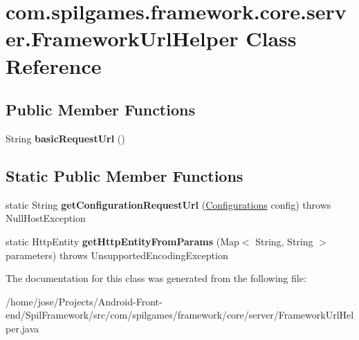\hypertarget{classcom_1_1spilgames_1_1framework_1_1core_1_1server_1_1_framework_url_helper}{\section{com.\-spilgames.\-framework.\-core.\-server.\-Framework\-Url\-Helper Class Reference}
\label{classcom_1_1spilgames_1_1framework_1_1core_1_1server_1_1_framework_url_helper}
}
\subsection*{Public Member Functions}
\begin{DoxyCompactItemize}
\item 
\hypertarget{classcom_1_1spilgames_1_1framework_1_1core_1_1server_1_1_framework_url_helper_ab3584e73334c303477371eb98eaa6947}{String {\bfseries basic\-Request\-Url} ()}\label{classcom_1_1spilgames_1_1framework_1_1core_1_1server_1_1_framework_url_helper_ab3584e73334c303477371eb98eaa6947}

\end{DoxyCompactItemize}
\subsection*{Static Public Member Functions}
\begin{DoxyCompactItemize}
\item 
\hypertarget{classcom_1_1spilgames_1_1framework_1_1core_1_1server_1_1_framework_url_helper_a3d0a1e7b9d94d87d33cb735abd8e07a6}{static String {\bfseries get\-Configuration\-Request\-Url} (\hyperlink{classcom_1_1spilgames_1_1framework_1_1data_1_1_configurations}{Configurations} config)  throws Null\-Host\-Exception }\label{classcom_1_1spilgames_1_1framework_1_1core_1_1server_1_1_framework_url_helper_a3d0a1e7b9d94d87d33cb735abd8e07a6}

\item 
\hypertarget{classcom_1_1spilgames_1_1framework_1_1core_1_1server_1_1_framework_url_helper_a3fc5bfec52098c826d4b999eb4ebd368}{static Http\-Entity {\bfseries get\-Http\-Entity\-From\-Params} (Map$<$ String, String $>$ parameters)  throws Unsupported\-Encoding\-Exception}\label{classcom_1_1spilgames_1_1framework_1_1core_1_1server_1_1_framework_url_helper_a3fc5bfec52098c826d4b999eb4ebd368}

\end{DoxyCompactItemize}


The documentation for this class was generated from the following file\-:\begin{DoxyCompactItemize}
\item 
/home/jose/\-Projects/\-Android-\/\-Front-\/end/\-Spil\-Framework/src/com/spilgames/framework/core/server/Framework\-Url\-Helper.\-java\end{DoxyCompactItemize}
